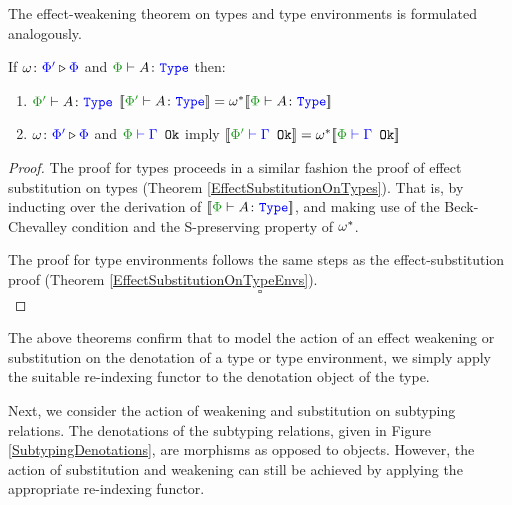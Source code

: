 \documentclass{Report}
\begin{document}
The effect-weakening theorem on types and type environments is formulated analogously.

\begin{framed}
    \begin{theorem}\label{EffectWeakeningOnTypes}  
        If $\omega \colon {\color{blue}\Phi'} \triangleright {\color {blue} \Phi}$ and $\wellformedtype{\P}{A}$ then:
        \begin{enumerate}[label=\roman*.]
            \item $\wellformedtype{\P'}{A}$ $\deno{\wellformedtype{\P'}{A}} = \w\star\deno{\wellformedtype{\P}{A}}$
            \item $\omega \colon {\color{blue}\Phi'} \triangleright {\color {blue} \Phi}$ and $\wellformedok{\P}{\G}$ imply $\deno{\wellformedok{\P'}{\G}} = \w\star\deno{\wellformedok{\P}{\G}}$
        \end{enumerate}        
    \end{theorem}
    

\begin{proof}
    The proof for types proceeds in a similar fashion the proof of effect substitution on types (Theorem \ref{EffectSubstitutionOnTypes}). That is, by inducting over the derivation of $\deno{\typerelation{\P}{A}{\type}}$, and making use of the Beck-Chevalley condition and the S-preserving property of $\omega^*$.
   
    The proof for type environments follows the same steps as the effect-substitution proof (Theorem \ref{EffectSubstitutionOnTypeEnvs}).
    $$\square$$
\end{proof}
\end{framed}

The above theorems confirm that to model the action of  an effect weakening or substitution on the denotation of a type or type environment, we simply apply the suitable re-indexing functor to the denotation object of the type.

Next, we consider the action of weakening and substitution on subtyping relations. The denotations of the subtyping relations, given in Figure \ref{SubtypingDenotations}, are morphisms as opposed to objects. However, the action of substitution and weakening can still be achieved by applying the appropriate re-indexing functor.
\end{document}
